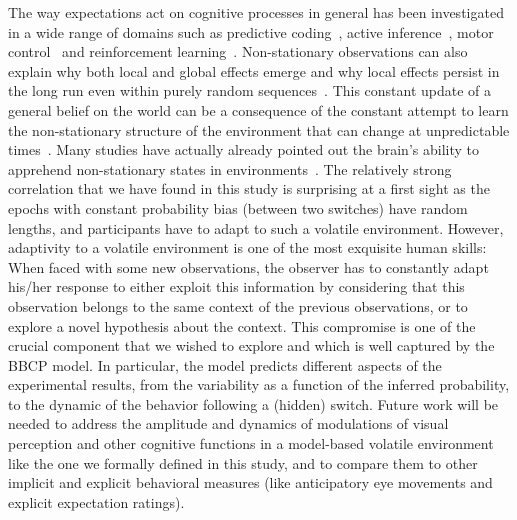 \documentclass[10pt,letterpaper]{article}
\newcommand{\citep}[1]{\cite{#1}}
\newcommand{\Rone}[1]{\textbf{\textcolor{magenta}{[rev 1: #1]}}}
\begin{document}
The way expectations act on cognitive processes in general has been investigated in a wide range of domains such as predictive coding~\citep{Wacongne2012}, active inference~\citep{Friston2010}, motor control~\citep{WolpertGhahramani2000} and reinforcement learning~\citep{Behrens07,Wilson13,Damasse18}. Non-stationary observations can also explain why both local and global effects emerge and why local effects persist in the long run even within purely random sequences~\citep{Cho2002, Yu2009}. This constant update of a general belief on the world can be a consequence of the constant attempt to learn the non-stationary structure of the environment that can change at unpredictable times~\citep{Yu2009}. Many studies have actually already pointed out the brain's ability to apprehend non-stationary states in environments~\citep{Ossmy2013, Meyniel15}.
The relatively strong correlation that we have found in this study is surprising at a first sight
as the epochs with constant probability bias (between two switches) have random lengths,
and participants have to adapt to such a volatile environment.
However, adaptivity to a volatile environment is one of the most exquisite human skills:
When faced with some new observations,
the observer has to constantly adapt his/her response
to either exploit this information by considering that
this observation belongs to the same context of the previous observations, or to explore
a novel hypothesis about the context.
This compromise is one of the crucial component that we wished to explore
and which is well captured by the BBCP model.
In particular, the model predicts different aspects
of the experimental results,
from the variability as a function of the inferred probability,
to the dynamic of the behavior following a (hidden) switch.
Future work will be needed to address the amplitude and dynamics of modulations of visual perception and other cognitive functions in a model-based volatile environment like the one we formally defined in this study, and to compare them to other implicit and explicit behavioral measures (like anticipatory eye movements and explicit expectation ratings).
\end{document}
